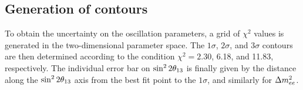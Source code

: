 \documentclass[../thesis.tex]{subfiles}
\begin{document}
\begin{comment}
Just take $(Fpred_i - Fobs_i)V^{-1}_{ij}(Fpred_j - Fobs_j)$
\end{comment}

\subsection{Generation of contours}
\label{sec:fitContours}

To obtain the uncertainty on the oscillation parameters, a grid of $\chi^2$ values is generated in the two-dimensional parameter space. The $1\sigma$, $2\sigma$, and $3\sigma$ contours are then determined according to the condition $\chi^2 = 2.30$, 6.18, and 11.83, respectively. The individual error bar on $\sin^2 2\theta_{13}$ is finally given by the distance along the $\sin^2 2\theta_{13}$ axis from the best fit point to the $1\sigma$, and similarly for $\Delta m^2_{ee}$.

\begin{comment}
Generate map of chi2 in oscillation parameter space. Take the 1sigma contour based on where the chi2 falls to XXX, etc.
\end{comment}
\end{document}
